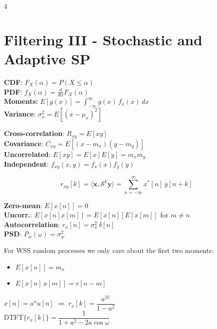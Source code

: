 \documentclass[8pt,a4paper,landscape]{extarticle}
\begin{document}
\begin{multicols*}{4}
\section{Filtering III - Stochastic and Adaptive SP}

\begin{defn}[title=Reminder - Proba]
\textbf{CDF}: $F_X(\alpha) = P(X \leq \alpha)$ \\
\textbf{PDF}: $f_X(\alpha) = \frac{d}{d\alpha}F_X(\alpha)$\\
\textbf{Moments:} $E[g(x)] = \int_{-\infty}^{\infty} g(x)\,f_x(x)\,dx$\\
\textbf{Variance}: $\sigma_x^2 = E[(x-\mu_x)^2]$
\end{defn}

\begin{defn}[title=Cross-correlation \& Covariance]
\textbf{Cross-correlation}: $R_{xy} = E[xy]$ \\
\textbf{Covariance}: $C_{xy} = E[(x-m_x)(y-m_y)]$ \\
\textbf{Uncorrelated}: $E[xy]=E[x]E[y]=m_x m_y$ \\
\textbf{Independent}: $f_{xy}(x,y)=f_x(x)f_y(y)$
\end{defn}

\begin{thm}[title=Cross-Correlation]
\[ r_{xy}[k] = \langle \mathbf{x}, \mathcal{S}^k \mathbf{y} \rangle = \sum_{n=-\infty}^{\infty} x^*[n]\,y[n+k] \]
\end{thm}

\begin{prop}[title=White Noise Process]
\textbf{Zero-mean}: $E[x[n]] = 0$ \\
\textbf{Uncorr.}: $E[x[n]x[m]] = E[x[n]]E[x[m]]$ for $m \neq n$ \\
\textbf{Autocorrelation}: $r_x[n] = \sigma_x^2\,\delta[n]$ \\
\textbf{PSD}: $P_w(\omega) = \sigma_w^2$
\end{prop}

\begin{defn}[title=Wide-Sense (WSS) stationarity]
For WSS random processes we only care about the first two moments:
\begin{itemize}
  \item $E[x[n]] = m_x$
  \item $E[x[n]\,x[m]] = r[n-m]$
\end{itemize}
\end{defn}

\begin{warn}[title=Autocorrelation (not given)]
$x[n] = a^n u[n] \;\Rightarrow\; r_x[k] = \dfrac{a^{|k|}}{1 - a^2}$\\
$\mathrm{DTFT}\{r_x[k]\} = \dfrac{1}{1 + a^2 - 2a\cos\omega}$
\end{warn}


\end{multicols*}
\end{document}
